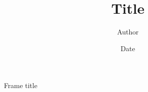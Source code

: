 \documentclass[trans]{beamer}
\title{Title}
\author{Author}
\date{Date}
\begin{document}

\frame{\titlepage}

\begin{frame}{Frame title}
	
\end{frame}

\end{document}
